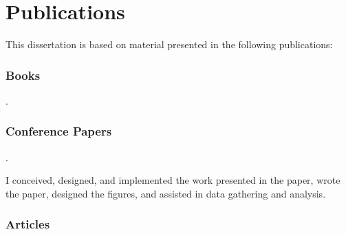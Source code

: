 \section{Publications}

This dissertation is based on material presented in the following publications:

\subsubsection{Books}

\begin{publications}
  \item {}
    .
\end{publications}

\subsubsection{Conference Papers}

\begin{publications}[resume]
  \item {}
    .
    \begin{authorsContribution}
      I conceived, designed, and implemented the work presented in the paper,
      wrote the paper, designed the figures, and assisted in data gathering
      and analysis.
    \end{authorsContribution}
\end{publications}

\subsubsection{Articles}

